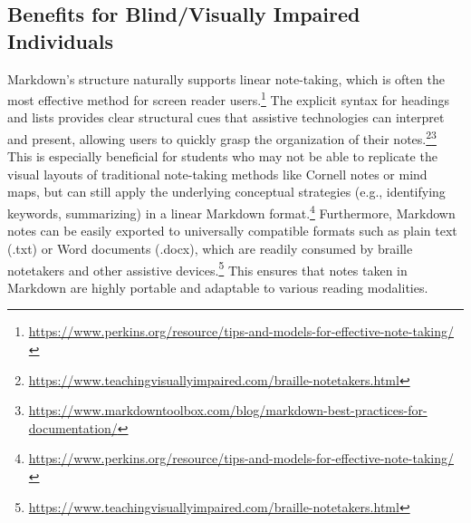 \subsection{Benefits for Blind/Visually Impaired Individuals}
Markdown's structure naturally supports linear note-taking, which is often the most effective method for screen reader users.\footnote{\url{https://www.perkins.org/resource/tips-and-models-for-effective-note-taking/}} The explicit syntax for headings and lists provides clear structural cues that assistive technologies can interpret and present, allowing users to quickly grasp the organization of their notes.\footnote{\url{https://www.teachingvisuallyimpaired.com/braille-notetakers.html}}\footnote{\url{https://www.markdowntoolbox.com/blog/markdown-best-practices-for-documentation/}} This is especially beneficial for students who may not be able to replicate the visual layouts of traditional note-taking methods like Cornell notes or mind maps, but can still apply the underlying conceptual strategies (e.g., identifying keywords, summarizing) in a linear Markdown format.\footnote{\url{https://www.perkins.org/resource/tips-and-models-for-effective-note-taking/}} Furthermore, Markdown notes can be easily exported to universally compatible formats such as plain text (.txt) or Word documents (.docx), which are readily consumed by braille notetakers and other assistive devices.\footnote{\url{https://www.teachingvisuallyimpaired.com/braille-notetakers.html}} This ensures that notes taken in Markdown are highly portable and adaptable to various reading modalities.

